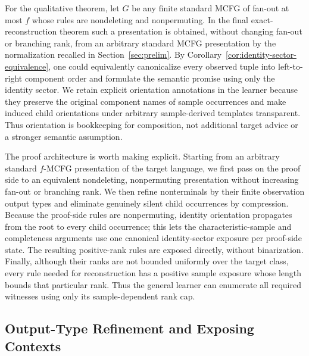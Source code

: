 \documentclass[11pt,a4paper]{article}
\numberwithin{equation}{section}
\theoremstyle{plain}
\theoremstyle{definition}
\theoremstyle{remark}
\begin{document}
For the qualitative theorem, let \(G\) be any finite standard MCFG of fan-out
at most \(f\) whose rules are nondeleting and nonpermuting.  In the final
exact-reconstruction theorem such a presentation is obtained, without
changing fan-out or branching rank, from an arbitrary standard MCFG
presentation by the normalization recalled in Section~\ref{sec:prelim}.
By Corollary~\ref{cor:identity-sector-equivalence}, one could equivalently
canonicalize every observed tuple into left-to-right component order and
formulate the semantic promise using only the identity sector.  We retain
explicit orientation annotations in the learner because they preserve the
original component names of sample occurrences and make induced child
orientations under arbitrary sample-derived templates transparent.  Thus
orientation is bookkeeping for composition, not additional target advice or
a stronger semantic assumption.

The proof architecture is worth making explicit.  Starting from an arbitrary
standard \(f\)-MCFG presentation of the target language, we first pass on the
proof side to an equivalent nondeleting, nonpermuting presentation without
increasing fan-out or branching rank.  We then refine nonterminals by their
finite observation output types and eliminate genuinely silent child
occurrences by compression.  Because the proof-side rules are nonpermuting,
identity orientation propagates from the root to every child occurrence; this
lets the characteristic-sample and completeness arguments use one canonical
identity-sector exposure per proof-side state.  The resulting positive-rank
rules are exposed directly, without binarization.  Finally, although their
ranks are not bounded uniformly over the target class, every rule needed for
reconstruction has a positive sample exposure whose length bounds that
particular rank.  Thus the general learner can enumerate all required
witnesses using only its sample-dependent rank cap.

\subsection{Output-Type Refinement and Exposing Contexts}
\label{sec:refinement}
\end{document}
